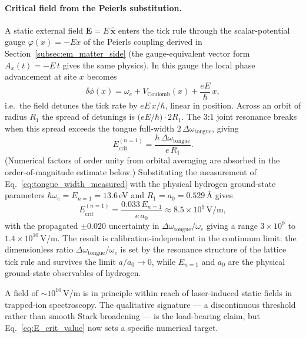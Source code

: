 \paragraph{Critical field from the Peierls substitution.}
A static external field $\mathbf{E} = E\,\hat{\mathbf{x}}$ enters the
tick rule through the scalar-potential gauge $\varphi(x) = -E x$ of
the Peierls coupling derived in
Section~\ref{subsec:em_matter_side} (the gauge-equivalent vector
form $A_x(t) = -E\,t$ gives the same physics).  In this gauge the
local phase advancement at site $x$ becomes
\begin{equation}
    \delta\phi(x) = \omega_e + V_\text{Coulomb}(x) + \frac{e E}{\hbar}\,x,
    \label{eq:stark_detune}
\end{equation}
i.e.\ the field detunes the tick rate by $eE\,x/\hbar$, linear in
position.  Across an orbit of radius $R_1$ the spread of detunings is
$\bigl(eE/\hbar\bigr)\!\cdot\!2 R_1$.  The 3:1 joint resonance breaks
when this spread exceeds the tongue full-width
$2\,\Delta\omega_\text{tongue}$, giving
\begin{equation}
    E_\text{crit}^{(n=1)}
        = \frac{\hbar\,\Delta\omega_\text{tongue}}{e\,R_1}.
    \label{eq:E_crit}
\end{equation}
(Numerical factors of order unity from orbital averaging are absorbed
in the order-of-magnitude estimate below.)  Substituting the
measurement of Eq.~\eqref{eq:tongue_width_measured} with the physical
hydrogen ground-state parameters $\hbar\omega_e = E_{n=1} = 13.6$\,eV
and $R_1 = a_0 = 0.529$\,\AA{} gives
\begin{equation}
    E_\text{crit}^{(n=1)}
        = \frac{0.033\,E_{n=1}}{e\,a_0}
        \approx 8.5 \times 10^{9}\,\text{V/m},
    \label{eq:E_crit_value}
\end{equation}
with the propagated $\pm 0.020$ uncertainty in
$\Delta\omega_\text{tongue}/\omega_e$ giving a range $3 \times 10^9$
to $1.4 \times 10^{10}$\,V/m.  The result is calibration-independent
in the continuum limit: the dimensionless ratio
$\Delta\omega_\text{tongue}/\omega_e$ is set by the resonance
structure of the lattice tick rule and survives the limit
$a/a_0 \to 0$, while $E_{n=1}$ and $a_0$ are the physical
ground-state observables of hydrogen.

A field of $\sim 10^{10}$\,V/m is in principle within reach of
laser-induced static fields in trapped-ion spectroscopy.  The
qualitative signature --- a discontinuous threshold rather than
smooth Stark broadening --- is the load-bearing claim, but
Eq.~\eqref{eq:E_crit_value} now sets a specific numerical target.

